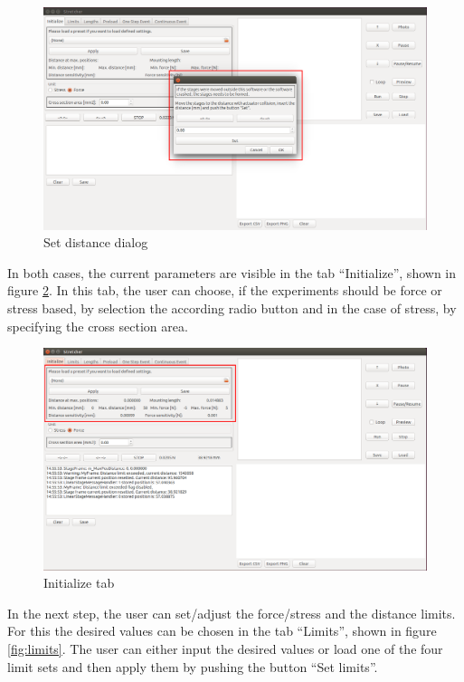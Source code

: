 \begin{figure}[!ht]
	\centering
		\includegraphics[width=1.0\textwidth]{images/StartUp2}
	\caption{Set distance dialog}
	\label{fig:setdistance}
\end{figure}

In both cases, the current parameters are visible in the tab ``Initialize'', shown in figure \ref{fig:initialize}. In this tab, the user can choose, if the experiments should be force or stress based, by selection the according radio button and in the case of stress, by specifying the cross section area.

\begin{figure}[!ht]
	\centering
		\includegraphics[width=1.0\textwidth]{images/Initialize}
	\caption{Initialize tab}
	\label{fig:initialize}
\end{figure}

In the next step, the user can set/adjust the force/stress and the distance limits. For this the desired values can be chosen in the tab ``Limits'', shown in figure \ref{fig:limits}. The user can either input the desired values or load one of the four limit sets and then apply them by pushing the button ``Set limits''.

